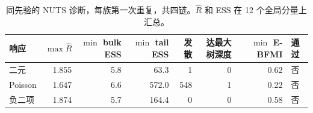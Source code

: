 \begin{table}[H]\centering\small
\caption{同先验的 NUTS 诊断，每族第一次重复，共四链。$\widehat R$ 和 ESS 在 12 个全局分量上汇总。}
\begin{tabular}{lrrrrrrl}\toprule
响应 & $\max\widehat R$ & $\min$ bulk ESS & $\min$ tail ESS & 发散 & 达最大树深度 & $\min$ E-BFMI & 通过 \\\midrule
二元 & 1.855 & 5.8 & 63.3 & 1 & 0 & 0.62 & 否 \\
Poisson & 1.647 & 6.6 & 572.0 & 548 & 1 & 0.22 & 否 \\
负二项 & 1.874 & 5.7 & 164.4 & 0 & 0 & 0.58 & 否 \\
\bottomrule\end{tabular}\end{table}

